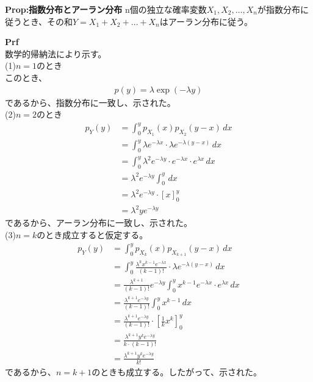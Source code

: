 \documentclass[a4paper,11pt]{jsarticle}
\numberwithin{equation}{section}
\begin{document}
\begin{itembox}[l]{\textbf{Prop:指数分布とアーラン分布}}
  n個の独立な確率変数$X_1, X_2, \dots, X_n$が指数分布に従うとき、その和$Y = X_1 + X_2 + \dots + X_n$はアーラン分布に従う。
\end{itembox}
\textbf{Prf}\\
数学的帰納法により示す。\\
(1)$n=1$のとき\\
このとき、
\begin{align}
  p(y) = \lambda \exp(-\lambda y)
\end{align}
であるから、指数分布に一致し、示された。\\
(2)$n=2$のとき\\
\begin{align}
  p_Y(y) &= \int_0^y p_{X_1}(x) p_{X_2}(y - x) \, dx \\
  &= \int_0^y \lambda e^{-\lambda x} \cdot \lambda e^{-\lambda (y - x)} \, dx \\
  &= \int_0^y \lambda^2 e^{-\lambda y} \cdot e^{-\lambda x} \cdot e^{\lambda x} \, dx \\
  &= \lambda^2 e^{-\lambda y} \int_0^y \, dx \\
  &= \lambda^2 e^{-\lambda y} \cdot \left[ x \right]_0^y \\
  &= \lambda^2 y e^{-\lambda y}
\end{align}
であるから、アーラン分布に一致し、示された。\\
(3)$n=k$のとき成立すると仮定する。\\
\begin{align}
  p_Y(y) &= \int_0^y p_{X_k}(x) p_{X_{k+1}}(y - x) \, dx \\
  &= \int_0^y \frac{\lambda^k x^{k-1} e^{-\lambda x}}{(k - 1)!} \cdot \lambda e^{-\lambda (y - x)} \, dx \\
  &= \frac{\lambda^{k+1}}{(k - 1)!} e^{-\lambda y} \int_0^y x^{k-1} e^{-\lambda x} \cdot e^{\lambda x} \, dx \\
  &= \frac{\lambda^{k+1} e^{-\lambda y}}{(k - 1)!} \int_0^y x^{k-1} \, dx \\
  &= \frac{\lambda^{k+1} e^{-\lambda y}}{(k - 1)!} \cdot \left[ \frac{1}{k} x^k \right]_0^y \\
  &= \frac{\lambda^{k+1} y^k e^{-\lambda y}}{k \cdot (k - 1)!} \\
  &= \frac{\lambda^{k+1} y^k e^{-\lambda y}}{k!}
\end{align}
であるから、$n=k+1$のときも成立する。したがって、示された。\hfill\qedsymbol\\
\end{document}
